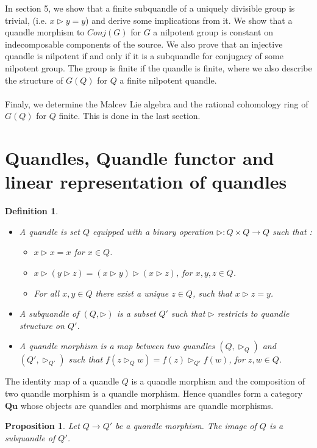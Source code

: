 \documentclass[12pt, reqno]{amsart}
\newtheorem{proposition}[theorem]{Proposition}
\newtheorem{definition}[theorem]{Definition}
\newcommand{\Q}{{\mathbf{Qu}}}
\begin{document}
In section 5, we show that a finite subquandle of a uniquely divisible group is trivial, (i.e. $x\triangleright y=y$) and derive some implications from it. We show that a quandle morphism to $Conj(G)$ for $G$ a nilpotent group is constant on indecomposable components of the source. We also prove that an injective quandle is nilpotent if and only if it is a subquandle for conjugacy of some nilpotent group. The group is finite if the quandle is finite, where we also describe the structure of $G(Q)$ for $Q$ a finite nilpotent quandle.\\\\
Finaly, we determine the Malcev Lie algebra and the rational cohomology ring of $G(Q)$ for $Q$ finite. This is done in the last section.

\section{Quandles, Quandle functor and linear representation of quandles}
\begin{definition}
\begin{itemize}
\item[1)] A quandle is set $Q$ equipped with a binary operation $\triangleright:Q\times Q \to Q$  such that :
\begin{itemize}
\item[a)] $x\triangleright x=x$ for $x\in Q$.
\item[b)] $x \triangleright( y\triangleright z)= (x \triangleright y) \triangleright (x \triangleright z)$, for $x,y,z \in Q$. 
\item[c)] For all $x,y \in Q$ there exist a unique $z\in Q$, such that $x \triangleright z=y$.
\end{itemize}
\item[2)] A subquandle of $(Q,\triangleright)$ is a subset $Q'$ such that $\triangleright$ restricts to quandle structure on $Q'$.
\item[3)] A quandle morphism is a map between two quandles $(Q,\triangleright_Q)$ and $(Q' ,\triangleright_{Q'})$ such that $f(z \triangleright_Q w)=f(z) \triangleright_{Q'} f(w)$, for $z,w \in Q$.
\end{itemize}
\end{definition}
The identity map of a quandle $Q$ is a quandle morphism and the composition of two quandle morphism is a quandle morphism. Hence quandles form a category $\Q$ whose objects are quandles and morphisms are quandle morphisms.
\begin{proposition}
Let $Q\to Q'$ be a quandle morphism. The image of $Q$ is a subquandle of $Q'$.
\end{proposition}
\end{document}
